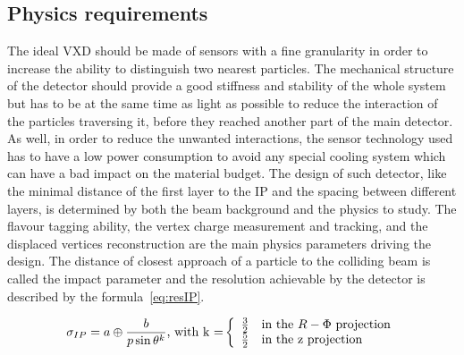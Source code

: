    \subsection{Physics requirements}
   
   The ideal \gls{VXD} should be made of sensors with a fine granularity in order to increase the ability to distinguish two nearest particles.
   The mechanical structure of the detector should provide a good stiffness and stability of the whole system but has to be at the same time as light as possible to reduce the interaction of the particles traversing it, before they reached another part of the main detector.
   As well, in order to reduce the unwanted interactions, the sensor technology used has to have a low power consumption to avoid any special cooling system which can have a bad impact on the material budget.
   The design of such detector, like the minimal distance of the first layer to the \gls{IP} and the spacing between different layers, is determined by both the beam background and the physics to study.
   The flavour tagging ability, the vertex charge measurement and tracking, and the displaced vertices reconstruction are the main physics parameters driving the design.
   The distance of closest approach of a particle to the colliding beam is called the impact parameter and the resolution achievable by the detector is described by the formula~\ref{eq:resIP}\cite{Battaglia2011}.
    
    \begin{equation}
      \sigma_{IP} = a \oplus \frac{b}{p \sin{\theta}^{k}} \text{, with k =}
      \left\{
        \begin{array}{r l}
          \frac{3}{2} & \text{in the } R - \Phi \text{ projection} \\
          \frac{5}{2} & \text{in the z projection}
        \end{array}
      \right. 
      \label{eq:resIP}
    \end{equation}


